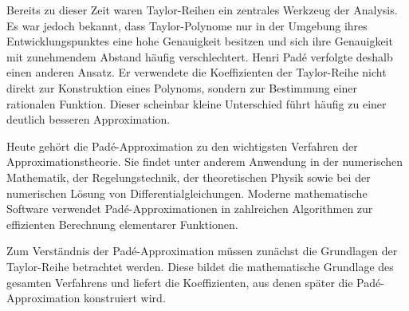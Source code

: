 Bereits zu dieser Zeit waren Taylor-Reihen ein zentrales Werkzeug der
Analysis. Es war jedoch bekannt, dass Taylor-Polynome nur in der
Umgebung ihres Entwicklungspunktes eine hohe Genauigkeit besitzen und
sich ihre Genauigkeit mit zunehmendem Abstand häufig verschlechtert.
Henri Padé verfolgte deshalb einen anderen Ansatz. Er verwendete die
Koeffizienten der Taylor-Reihe nicht direkt zur Konstruktion eines
Polynoms, sondern zur Bestimmung einer rationalen Funktion. Dieser
scheinbar kleine Unterschied führt häufig zu einer deutlich besseren
Approximation.

Heute gehört die Padé-Approximation zu den wichtigsten Verfahren der
Approximationstheorie. Sie findet unter anderem Anwendung in der
numerischen Mathematik, der Regelungstechnik, der theoretischen Physik
sowie bei der numerischen Lösung von Differentialgleichungen. Moderne
mathematische Software verwendet Padé-Approximationen in zahlreichen
Algorithmen zur effizienten Berechnung elementarer Funktionen.

Zum Verständnis der Padé-Approximation müssen zunächst die Grundlagen
der Taylor-Reihe betrachtet werden. Diese bildet die mathematische
Grundlage des gesamten Verfahrens und liefert die Koeffizienten, aus
denen später die Padé-Approximation konstruiert wird.
